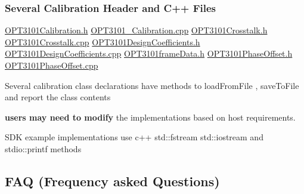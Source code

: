 \subsubsection*{Several Calibration Header and C++ Files}

\mbox{\hyperlink{_o_p_t3101_calibration_8h}{O\+P\+T3101\+Calibration.\+h}} \mbox{\hyperlink{_o_p_t3101___calibration_8cpp}{O\+P\+T3101\+\_\+\+Calibration.\+cpp}} \mbox{\hyperlink{_o_p_t3101_crosstalk_8h}{O\+P\+T3101\+Crosstalk.\+h}} \mbox{\hyperlink{_o_p_t3101_crosstalk_8cpp}{O\+P\+T3101\+Crosstalk.\+cpp}} \mbox{\hyperlink{_o_p_t3101_design_coefficients_8h}{O\+P\+T3101\+Design\+Coefficients.\+h}} \mbox{\hyperlink{_o_p_t3101_design_coefficients_8cpp}{O\+P\+T3101\+Design\+Coefficients.\+cpp}} \mbox{\hyperlink{_o_p_t3101frame_data_8h}{O\+P\+T3101frame\+Data.\+h}} \mbox{\hyperlink{_o_p_t3101_phase_offset_8h}{O\+P\+T3101\+Phase\+Offset.\+h}} \mbox{\hyperlink{_o_p_t3101_phase_offset_8cpp}{O\+P\+T3101\+Phase\+Offset.\+cpp}}
\begin{DoxyItemize}
\item Several calibration class declarations have methods to load\+From\+File , save\+To\+File and report the class contents
\item {\bfseries users may need to modify} the implementations based on host requirements.
\item S\+DK example implementations use c++ std\+::fstream std\+::iostream and stdio\+::printf methods
\end{DoxyItemize}





\subsection*{\label{_FAQ}%
F\+AQ (Frequency asked Questions)}



